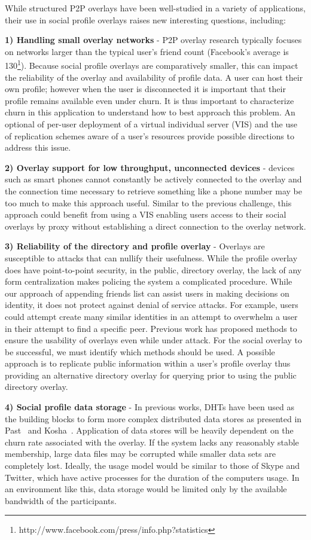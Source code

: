 \documentclass{IEEEtran}
\begin{document}
While structured P2P overlays have been well-studied in a variety of
applications, their use in social profile overlays raises new interesting
questions, including:

{\bf 1) Handling small overlay networks} - P2P overlay research typically
focuses on networks larger than the typical user's friend count (Facebook's
average is 130\footnote{http://www.facebook.com/press/info.php?statistics}).
Because social profile overlays are comparatively smaller, this can impact the
reliability of the overlay and availability of profile data.  A user can host
their own profile; however when the user is disconnected it is important that
their profile remains available even under churn. It is thus important to
characterize churn in this application to understand how to best approach this
problem. An optional of per-user deployment of a virtual individual server
(VIS) and the use of replication schemes aware of a user's resources provide
possible directions to address this issue.

{\bf 2) Overlay support for low throughput, unconnected devices} - devices such
as smart phones cannot constantly be actively connected to the overlay and the
connection time necessary to retrieve something like a phone number may be too
much to make this approach useful.  Similar to the previous challenge, this
approach could benefit from using a VIS enabling users access to their social
overlays by proxy without establishing a direct connection to the overlay
network.

{\bf 3) Reliability of the directory and profile overlay} - Overlays are
susceptible to attacks that can nullify their usefulness.  While the profile
overlay does have point-to-point security, in the public, directory overlay,
the lack of any form centralization makes policing the system a complicated
procedure.  While our approach of appending friends list can assist users in
making decisions on identity, it does not protect against denial of service
attacks.  For example, users could attempt create many similar identities in
an attempt to overwhelm a user in their attempt to find a specific peer.
Previous work has proposed methods to ensure the usability of overlays even
while under attack.  For the social overlay to be successful, we must identify
which methods should be used. A possible approach is to replicate public
information within a user's profile overlay thus providing an alternative
directory overlay for querying prior to using the public directory overlay.

{\bf 4) Social profile data storage} - In previous works, DHTs have been used
as the building blocks to form more complex distributed data stores as
presented in Past~\cite{past} and Kosha~\cite{kosha}.  Application of data
stores will be heavily dependent on the churn rate associated with the overlay.
If the system lacks any reasonably stable membership, large data files may be
corrupted while smaller data sets are completely lost.  Ideally, the usage
model would be similar to those of Skype and Twitter, which have active
processes for the duration of the computers usage.  In an environment like
this, data storage would be limited only by the available bandwidth of the
participants.
\end{document}
